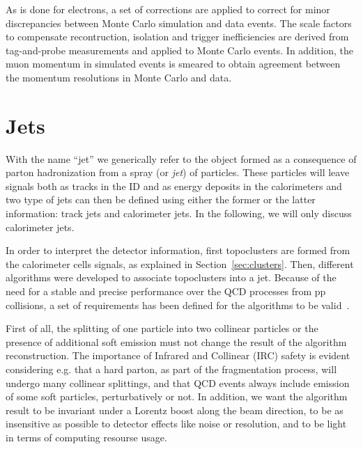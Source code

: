 As is done for electrons, a set of corrections are applied to correct for minor
discrepancies between Monte Carlo simulation and data events.
The scale factors to compensate recontruction, isolation and trigger 
inefficiencies are derived from tag-and-probe measurements
and applied to Monte Carlo events. In addition, the muon momentum
in simulated events is smeared to obtain agreement between the momentum
resolutions in Monte Carlo and data.


\section{Jets}\label{sec:jets}

With the name ``jet'' we generically refer to the object formed as a consequence
of parton hadronization from a spray (or {\it jet}) of particles. These particles
will leave signals both as tracks in the ID and as energy deposits in the calorimeters
and two type of jets can then be defined using either the former or the latter information:
track jets and calorimeter jets. In the following, we will only discuss calorimeter jets.

In order to interpret the detector information, first topoclusters are formed from the
calorimeter cells signals, as explained in Section~\ref{sec:clusters}. Then, different
algorithms were developed to associate topoclusters into a jet. Because of the
need for a stable and precise performance over the QCD processes from pp collisions,
a set of requirements has been defined for the algorithms to be valid~\cite{Salam:2009jx}.

First of all, the splitting of one particle into two collinear particles 
or the presence of additional soft emission must not change the 
result of the algorithm reconstruction.
The importance of Infrared and Collinear (IRC) safety is evident considering e.g. 
that a hard parton, as part of the fragmentation process, will undergo many collinear splittings,
and that QCD events always include emission of some soft particles, perturbatively or not.
In addition, we want the algorithm result to be invariant under a Lorentz boost along the beam direction,
to be as insensitive as possible to detector effects like noise or resolution, and to be light in terms
of computing resourse usage.

